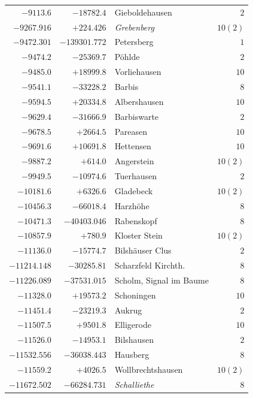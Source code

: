 \begin{center}
\begin{tabular}{r|r|p{170pt}|r}
\(-9113.6\)&\(-18782.4\)&Gieboldehausen&\(2\)\\
\(-9267.916\)&\(+224.426\)&\textit{Grebenberg}&\(10 (2)\)\\
\(-9472.301\)&\(-139301.772\)&Petersberg&\(1\)\\
\(-9474.2\)&\(-25369.7\)&Pöhlde&\(2\)\\
\(-9485.0\)&\(+18999.8\)&Vorliehausen&\(10\)\\
\(-9541.1\)&\(-33228.2\)&Barbis&\(8\)\\
\(-9594.5\)&\(+20334.8\)&Albershausen&\(10\)\\
\(-9629.4\)&\(-31666.9\)&Barbiswarte&\(2\)\\
\(-9678.5\)&\(+2664.5\)&Pareasen&\(10\)\\
\(-9691.6\)&\(+10691.8\)&Hettensen&\(10\)\\
\(-9887.2\)&\(+614.0\)&Angerstein&\(10 (2)\)\\
\(-9949.5\)&\(-10974.6\)&Tuerhausen&\(2\)\\
\(-10181.6\)&\(+6326.6\)&Gladebeck&\(10 (2)\)\\
\(-10456.3\)&\(-66018.4\)&Harzhöhe&\(8\)\\
\(-10471.3\)&\(-40403.046\)&Rabenskopf&\(8\)\\
\(-10857.9\)&\(+780.9\)&Kloster Stein&\(10 (2)\)\\
\(-11136.0\)&\(-15774.7\)&Bilshäuser Clus&\(2\)\\
\(-11214.148\)&\(-30285.81\)&Scharzfeld Kirchth.&\(8\)\\
\(-11226.089\)&\(-37531.015\)&Scholm, Signal im Baume&\(8\)\\
\(-11328.0\)&\(+19573.2\)&Schoningen&\(10\)\\
\(-11451.4\)&\(-23219.3\)&Aukrug&\(2\)\\
\(-11507.5\)&\(+9501.8\)&Elligerode&\(10\)\\
\(-11526.0\)&\(-14953.1\)&Bilshausen&\(2\)\\
\(-11532.556\)&\(-36038.443\)&Hausberg&\(8\)\\
\(-11559.2\)&\(+4026.5\)&Wollbrechtshausen&\(10 (2)\)\\
\(-11672.502\)&\(-66284.731\)&\textit{Schalliethe}&\(8\)\\
\hline\end{tabular}\endgroup\end{center}

